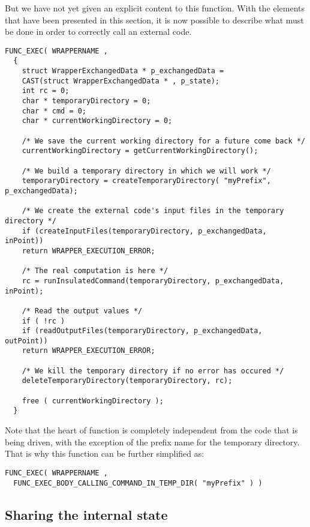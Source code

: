 But we have not yet given an explicit content to this function. With the elements that have been presented in this section, it is now possible to describe what must be done in order to correctly call an external code.

\lstset{language=C++, basicstyle=\normalsize}
\begin{lstlisting}[frame=TBRL]
  FUNC_EXEC( WRAPPERNAME ,
  {
    struct WrapperExchangedData * p_exchangedData =
    CAST(struct WrapperExchangedData * , p_state);
    int rc = 0;
    char * temporaryDirectory = 0;
    char * cmd = 0;
    char * currentWorkingDirectory = 0;

    /* We save the current working directory for a future come back */
    currentWorkingDirectory = getCurrentWorkingDirectory();

    /* We build a temporary directory in which we will work */
    temporaryDirectory = createTemporaryDirectory( "myPrefix", p_exchangedData);

    /* We create the external code's input files in the temporary directory */
    if (createInputFiles(temporaryDirectory, p_exchangedData, inPoint))
    return WRAPPER_EXECUTION_ERROR;

    /* The real computation is here */
    rc = runInsulatedCommand(temporaryDirectory, p_exchangedData, inPoint);

    /* Read the output values */
    if ( !rc )
    if (readOutputFiles(temporaryDirectory, p_exchangedData, outPoint))
    return WRAPPER_EXECUTION_ERROR;

    /* We kill the temporary directory if no error has occured */
    deleteTemporaryDirectory(temporaryDirectory, rc);

    free ( currentWorkingDirectory );
  }
\end{lstlisting}

Note that the heart of function is completely independent from the code that is being driven, with the exception of the prefix name for the temporary directory. That is why this function can be further simplified as:

\lstset{language=C++, basicstyle=\normalsize}
\begin{lstlisting}[frame=TBRL]
  FUNC_EXEC( WRAPPERNAME ,
  FUNC_EXEC_BODY_CALLING_COMMAND_IN_TEMP_DIR( "myPrefix" ) )
\end{lstlisting}

\subsection{Sharing the internal state}

